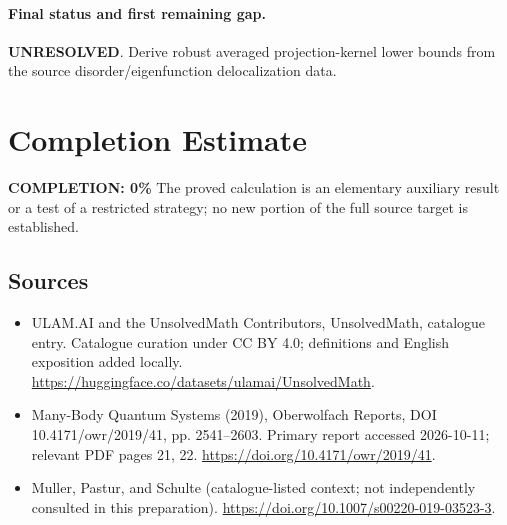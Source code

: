 \documentclass[11pt]{article}
\begin{document}
\paragraph{Final status and first remaining gap.}
\textbf{UNRESOLVED}. Derive robust averaged projection-kernel lower bounds from the source disorder/eigenfunction delocalization data.

\section{Completion Estimate}
\noindent\textbf{COMPLETION: 0\%}
The proved calculation is an elementary auxiliary result or a test of a restricted strategy; no new portion of the full source target is established.

\subsection{Sources}
\begin{itemize}
\item[\hypertarget{source:statement:1}{S1}] ULAM.AI and the UnsolvedMath Contributors, UnsolvedMath, catalogue entry. Catalogue curation under CC BY 4.0; definitions and English exposition added locally.
\url{https://huggingface.co/datasets/ulamai/UnsolvedMath}.
\item[\hypertarget{source:statement:2}{S2}] Many-Body Quantum Systems (2019), Oberwolfach Reports, DOI 10.4171/owr/2019/41, pp. 2541--2603. Primary report accessed 2026-10-11; relevant PDF pages 21, 22.
\url{https://doi.org/10.4171/owr/2019/41}.
\item[\hypertarget{source:statement:3}{S3}] Muller, Pastur, and Schulte (catalogue-listed context; not independently consulted in this preparation).
\url{https://doi.org/10.1007/s00220-019-03523-3}.
\end{itemize}
\label{end:statement}
\end{document}
